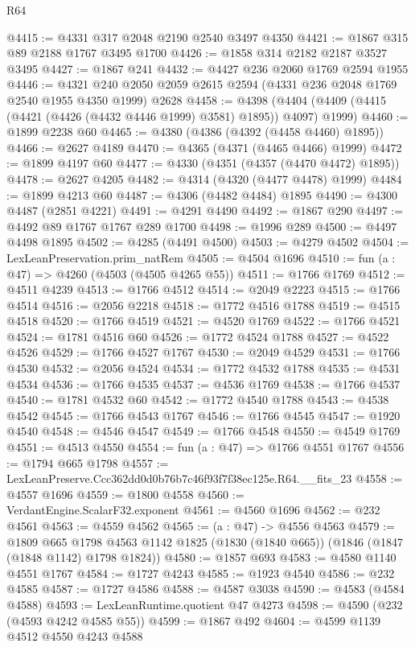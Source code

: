 \begin{lexlean}{R64}
\begin{coremodule}
@4415 := @4331 @317 @2048 @2190 @2540 @3497 @4350
@4421 := @1867 @315 @89 @2188 @1767 @3495 @1700
@4426 := @1858 @314 @2182 @2187 @3527 @3495
@4427 := @1867 @241
@4432 := @4427 @236 @2060 @1769 @2594 @1955
@4446 := @4321 @240 @2050 @2059 @2615 @2594 (@4331 @236 @2048 @1769 @2540 @1955 @4350 @1999) @2628
@4458 := @4398 (@4404 (@4409 (@4415 (@4421 (@4426 (@4432 @4446 @1999) @3581) @1895)) @4097) @1999)
@4460 := @1899 @2238 @60
@4465 := @4380 (@4386 (@4392 (@4458 @4460) @1895))
@4466 := @2627 @4189
@4470 := @4365 (@4371 (@4465 @4466) @1999)
@4472 := @1899 @4197 @60
@4477 := @4330 (@4351 (@4357 (@4470 @4472) @1895))
@4478 := @2627 @4205
@4482 := @4314 (@4320 (@4477 @4478) @1999)
@4484 := @1899 @4213 @60
@4487 := @4306 (@4482 @4484) @1895
@4490 := @4300 @4487 (@2851 @4221)
@4491 := @4291 @4490
@4492 := @1867 @290
@4497 := @4492 @89 @1767 @1767 @289 @1700
@4498 := @1996 @289
@4500 := @4497 @4498 @1895
@4502 := @4285 (@4491 @4500)
@4503 := @4279 @4502
@4504 := LexLeanPreservation.prim_natRem
@4505 := @4504 @1696
@4510 := fun (a : @47) => @4260 (@4503 (@4505 @4265 @55))
@4511 := @1766 @1769
@4512 := @4511 @4239
@4513 := @1766 @4512
@4514 := @2049 @2223
@4515 := @1766 @4514
@4516 := @2056 @2218
@4518 := @1772 @4516 @1788
@4519 := @4515 @4518
@4520 := @1766 @4519
@4521 := @4520 @1769
@4522 := @1766 @4521
@4524 := @1781 @4516 @60
@4526 := @1772 @4524 @1788
@4527 := @4522 @4526
@4529 := @1766 @4527 @1767
@4530 := @2049 @4529
@4531 := @1766 @4530
@4532 := @2056 @4524
@4534 := @1772 @4532 @1788
@4535 := @4531 @4534
@4536 := @1766 @4535
@4537 := @4536 @1769
@4538 := @1766 @4537
@4540 := @1781 @4532 @60
@4542 := @1772 @4540 @1788
@4543 := @4538 @4542
@4545 := @1766 @4543 @1767
@4546 := @1766 @4545
@4547 := @1920 @4540
@4548 := @4546 @4547
@4549 := @1766 @4548
@4550 := @4549 @1769
@4551 := @4513 @4550
@4554 := fun (a : @47) => @1766 @4551 @1767
@4556 := @1794 @665 @1798
@4557 := LexLeanPreserve.Ccc362dd0d0b76b7c46f93f7f38ec125e.R64.__fits_23
@4558 := @4557 @1696
@4559 := @1800 @4558
@4560 := VerdantEngine.ScalarF32.exponent
@4561 := @4560 @1696
@4562 := @232 @4561
@4563 := @4559 @4562
@4565 := (a : @47) -> @4556 @4563
@4579 := @1809
    @665
    @1798
    @4563
    @1142
    @1825
    (@1830 (@1840 @665))
    (@1846 (@1847 (@1848 @1142) @1798 @1824))
@4580 := @1857 @693
@4583 := @4580 @1140 @4551 @1767
@4584 := @1727 @4243
@4585 := @1923 @4540
@4586 := @232 @4585
@4587 := @1727 @4586
@4588 := @4587 @3038
@4590 := @4583 (@4584 @4588)
@4593 := LexLeanRuntime.quotient @47 @4273
@4598 := @4590 (@232 (@4593 @4242 @4585 @55))
@4599 := @1867 @492
@4604 := @4599 @1139 @4512 @4550 @4243 @4588

\end{coremodule}
\end{lexlean}
